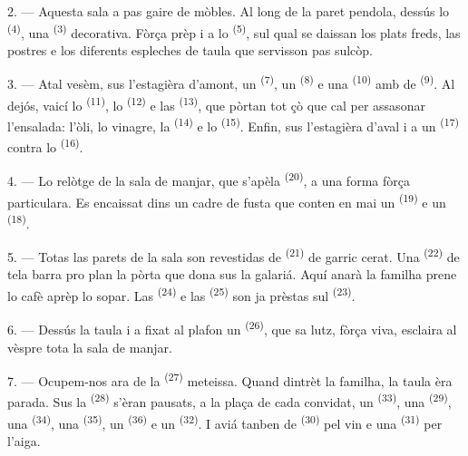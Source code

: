 2. --- Aquesta sala a pas gaire de mòbles. Al long de la paret pendola, dessús lo
 \textsuperscript{(4)}, una 
\textsuperscript{(3)} decorativa. Fòrça prèp i a lo 
\textsuperscript{(5)}, sul qual se daissan los plats freds, las postres e los
diferents espleches de taula que servisson pas sulcòp.

3. --- Atal vesèm, sus l'estagièra d'amont, un 
\textsuperscript{(7)}, un  \textsuperscript{(8)} e una 
\textsuperscript{(10)} amb de  \textsuperscript{(9)}. Al dejós,
vaicí lo  \textsuperscript{(11)}, lo 
\textsuperscript{(12)} e las  \textsuperscript{(13)}, que pòrtan
tot çò que cal per assasonar l'ensalada: l'òli, lo vinagre, la 
\textsuperscript{(14)} e lo  \textsuperscript{(15)}. Enfin, sus
l'estagièra d'aval i a un  \textsuperscript{(17)} contra lo
 \textsuperscript{(16)}.

4. --- Lo relòtge de la sala de manjar, que s'apèla 
\textsuperscript{(20)}, a una forma fòrça particulara. Es encaissat dins un cadre
de fusta que conten en mai un  \textsuperscript{(19)} e un
 \textsuperscript{(18)}.

\VUsaut{4.6mm}
\VUsaut{3.0mm}

5. --- Totas las parets de la sala son revestidas de 
\textsuperscript{(21)} de garric cerat. Una 
\textsuperscript{(22)} de tela barra pro plan la pòrta que dona sus la galariá.
Aquí anarà la familha prene lo cafè aprèp lo sopar. Las 
\textsuperscript{(24)} e las  \textsuperscript{(25)} son ja
prèstas sul  \textsuperscript{(23)}.

6. --- Dessús la taula i a fixat al plafon un 
\textsuperscript{(26)}, que sa lutz, fòrça viva, esclaira al vèspre tota la sala
de manjar.

7. --- Ocupem-nos ara de la  \textsuperscript{(27)}
meteissa. Quand dintrèt la familha, la taula èra parada. Sus la 
\textsuperscript{(28)} s'èran pausats, a la plaça de cada convidat, un
 \textsuperscript{(33)}, una 
\textsuperscript{(29)}, una  \textsuperscript{(34)}, una
 \textsuperscript{(35)}, un 
\textsuperscript{(36)} e un  \textsuperscript{(32)}. I aviá tanben
de  \textsuperscript{(30)} pel vin e una 
\textsuperscript{(31)} per l'aiga.

